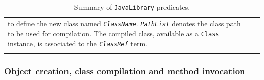 \begin{table}
\begin{center}
{\begin{tabular}{p{2.3cm}p{6.6cm}p{4.6cm}}
    to define the new class named \texttt{\textit{ClassName}}.
    \texttt{\textit{PathList}} denotes the class path to be used
    for compilation.
    The compiled class, available as a \texttt{Class} instance,
    is associated to the \texttt{\textit{ClassRef}} term.
    \\
    \\
    \hline\hline
    \end{tabular}
    }\end{center}
    \caption{Summary of \texttt{JavaLibrary} predicates.}
    \label{tab:summary-of-javalibrary-predicates}
\end{table}

\subsubsection{Object creation, class compilation and method invocation}

